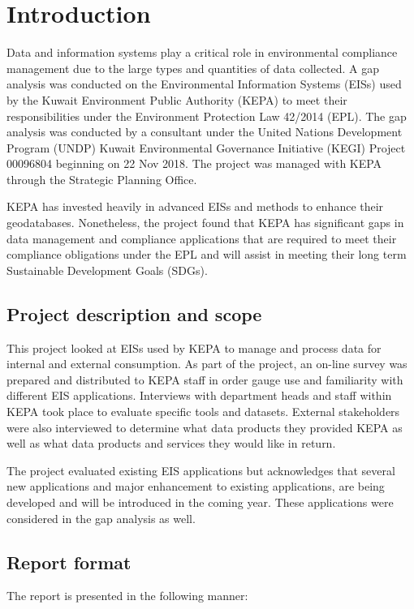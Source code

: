 \chapter{Introduction} 

Data and information systems play a critical role in environmental compliance management due to the large types and quantities of data collected. A gap analysis was conducted on the Environmental Information Systems (EISs) used by the Kuwait Environment Public Authority (KEPA) to meet their responsibilities under the Environment Protection Law 42/2014 (EPL). The gap analysis was conducted by a consultant under the United Nations Development Program (UNDP) Kuwait Environmental Governance Initiative (KEGI) Project 00096804 beginning on 22 Nov 2018. The project was managed with KEPA through the Strategic Planning Office.

KEPA has invested heavily in advanced EISs and methods to enhance their geodatabases. Nonetheless, the project found that KEPA has significant gaps in data management and compliance applications that are required to meet their compliance obligations under the EPL and will assist in meeting their long term Sustainable Development Goals (SDGs).

\section{Project description and scope}

This project looked at EISs used by KEPA to manage and process data for internal and external consumption. As part of the project, an on-line survey was prepared and distributed to KEPA staff in order gauge use and familiarity with different EIS applications. Interviews with department heads and staff within KEPA took place to evaluate specific tools and datasets. External stakeholders were also interviewed to determine what data products they provided KEPA as well as what data products and services they would like in return.

The project evaluated existing EIS applications but acknowledges that several new applications and major enhancement to existing applications, are being developed and will be introduced in the coming year. These applications were considered in the gap analysis as well.


\section{Report format}
The report is presented in the following manner:

